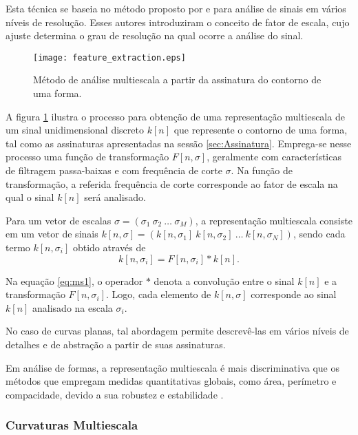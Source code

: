 Esta técnica se baseia no método proposto por  e  para análise de sinais em vários níveis de resolução. Esses autores introduziram o conceito de fator de escala, cujo ajuste determina o grau de resolução na qual ocorre a análise do sinal. 

\begin{figure}[h!]
  \caption{\label{fig:ms} Método de análise multiescala a partir da assinatura do contorno de uma forma.}
  \centering
  \texttt{[image: feature\_extraction.eps]}
\end{figure}

A figura \ref{fig:ms} ilustra o processo para obtenção de uma representação multiescala de um sinal unidimensional discreto $k[n]$ que represente o contorno de uma forma, tal como as assinaturas apresentadas na sessão \ref{sec:Assinatura}. Emprega-se nesse processo uma função de transformação $F[n,\sigma]$, geralmente com características de filtragem passa-baixas e com frequência de corte $\sigma$. Na função de transformação, a referida frequência de corte corresponde ao fator de escala na qual o sinal $k[n]$ será analisado. 

Para um vetor de escalas $\sigma = (\sigma_1\:\sigma_2\:\ldots\:\sigma_M) $, a representação multiescala consiste em um vetor de sinais $k[n,\sigma] = (k[n,\sigma_1]\:k[n,\sigma_2]\:\ldots\:k[n,\sigma_N])$, sendo cada termo $k[n,\sigma_i]$ obtido através de
\begin{equation}\label{eq:ms1}
k[n,\sigma_i] = F[n,\sigma_i]*k[n]\text{.}
\end{equation}

Na equação \ref{eq:ms1}, o operador $*$ denota a convolução entre o sinal $k[n]$ e a transformação $F[n,\sigma_i]$. Logo, cada elemento de $k[n,\sigma]$ corresponde ao sinal $k[n]$ analisado na escala $\sigma_i$.

No caso de curvas planas, tal abordagem permite descrevê-las em vários níveis de detalhes e de abstração a partir de suas assinaturas. 

Em análise de formas, a representação multiescala é mais discriminativa que os métodos que empregam medidas quantitativas globais, como área, perímetro e compacidade, devido a sua robustez e estabilidade \cite{4756134}.    

\subsubsection{Curvaturas Multiescala\label{subsec:curvMS}}

